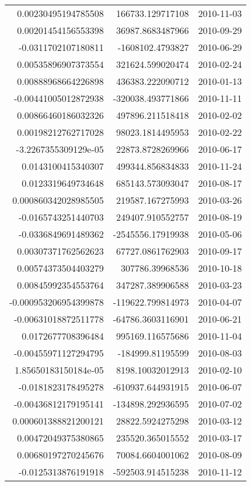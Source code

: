 \begin{tabular}{r | r | l}
0.00230495194785508 & 166733.129717108 & 2010-11-03 \\
0.00201454156553398 & 36987.8683487966 & 2010-09-29 \\
-0.0311702107180811 & -1608102.4793827 & 2010-06-29 \\
0.00535896907373554 & 321624.599020474 & 2010-02-24 \\
0.00888968664226898 & 436383.222090712 & 2010-01-13 \\
-0.00441005012872938 & -320038.493771866 & 2010-11-11 \\
0.00866460186032326 & 497896.211518418 & 2010-02-02 \\
0.00198212762717028 & 98023.1814495953 & 2010-02-22 \\
-3.2267355309129e-05 & 22873.8728269966 & 2010-06-17 \\
0.0143100415340307 & 499344.856834833 & 2010-11-24 \\
0.0123319649734648 & 685143.573093047 & 2010-08-17 \\
0.000860342028985505 & 219587.167275993 & 2010-03-26 \\
-0.0165743251440703 & 249407.910552757 & 2010-08-19 \\
-0.0336849691489362 & -2545556.17919938 & 2010-05-06 \\
0.00307371762562623 & 67727.0861762903 & 2010-09-17 \\
0.00574373504403279 & 307786.39968536 & 2010-10-18 \\
0.00845992354553764 & 347287.389906588 & 2010-03-23 \\
-0.000953206954399878 & -119622.799814973 & 2010-04-07 \\
-0.00631018872511778 & -64786.3603116901 & 2010-06-21 \\
0.0172677708396484 & 995169.116575686 & 2010-11-04 \\
-0.00455971127294795 & -184999.81195599 & 2010-08-03 \\
1.85650183150184e-05 & 8198.10032012913 & 2010-02-10 \\
-0.0181823178495278 & -610937.644931915 & 2010-06-07 \\
-0.00436812179195141 & -134898.292936595 & 2010-07-02 \\
0.000601388821200121 & 28822.5924275298 & 2010-03-12 \\
0.00472049375380865 & 235520.365015552 & 2010-03-17 \\
0.00680197270245676 & 70084.6604001062 & 2010-08-09 \\
-0.0125313876191918 & -592503.914515238 & 2010-11-12 \\

\end{tabular}
